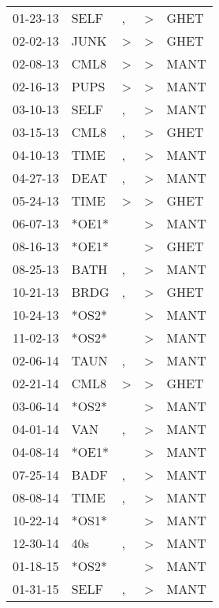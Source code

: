 \begin{supertabular}{lllll}
 01-23-13 &   SELF &             , &  \textgreater &  GHET \\
 02-02-13 &   JUNK &  \textgreater &  \textgreater &  GHET \\
 02-08-13 &   CML8 &  \textgreater &  \textgreater &  MANT \\
 02-16-13 &   PUPS &  \textgreater &  \textgreater &  MANT \\
 03-10-13 &   SELF &             , &  \textgreater &  MANT \\
 03-15-13 &   CML8 &             , &  \textgreater &  GHET \\
 04-10-13 &   TIME &             , &  \textgreater &  MANT \\
 04-27-13 &   DEAT &             , &  \textgreater &  MANT \\
 05-24-13 &   TIME &  \textgreater &  \textgreater &  GHET \\
 06-07-13 &  *OE1* &               &  \textgreater &  MANT \\
 08-16-13 &  *OE1* &               &  \textgreater &  GHET \\
 08-25-13 &   BATH &             , &  \textgreater &  MANT \\
 10-21-13 &   BRDG &             , &  \textgreater &  GHET \\
 10-24-13 &  *OS2* &               &  \textgreater &  MANT \\
 11-02-13 &  *OS2* &               &  \textgreater &  MANT \\
 02-06-14 &   TAUN &             , &  \textgreater &  MANT \\
 02-21-14 &   CML8 &  \textgreater &  \textgreater &  GHET \\
 03-06-14 &  *OS2* &               &  \textgreater &  MANT \\
 04-01-14 &    VAN &             , &  \textgreater &  MANT \\
 04-08-14 &  *OE1* &               &  \textgreater &  MANT \\
 07-25-14 &   BADF &             , &  \textgreater &  MANT \\
 08-08-14 &   TIME &             , &  \textgreater &  MANT \\
 10-22-14 &  *OS1* &               &  \textgreater &  MANT \\
 12-30-14 &    40s &             , &  \textgreater &  MANT \\
 01-18-15 &  *OS2* &               &  \textgreater &  MANT \\
 01-31-15 &   SELF &             , &  \textgreater &  MANT \\

\end{supertabular}
